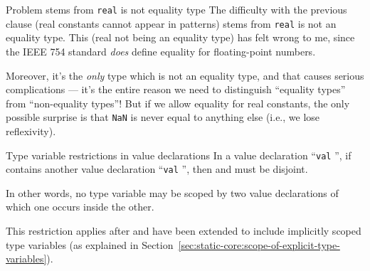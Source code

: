 \begin{remark}{Problem stems from \texttt{real} is not equality type}
The difficulty with the previous clause (real constants cannot appear in
patterns) stems from \texttt{real} is not an equality type. This (real
not being an equality type) has felt wrong to me, since the IEEE 754
standard \emph{does} define equality for floating-point
numbers.

Moreover, it's the \emph{only} type which is not an equality
type, and that causes serious complications --- it's the entire reason we
need to distinguish ``equality types'' from ``non-equality types''! But
if we allow equality for real constants, the only possible surprise is
that \texttt{NaN} is never equal to anything else (i.e., we lose
reflexivity). 
\end{remark}

\begin{clause}{Type variable restrictions in value declarations}\label{clause:syntax-core:type-variable-restrictions-in-value-declarations}
In a value declaration ``\texttt{val}  '', if
 contains another value declaration ``\texttt{val} 
'', then  and  must be disjoint.

In other words, no type variable may be scoped by two value declarations
of which one occurs inside the other.

This restriction applies after  and  have been
extended to include implicitly scoped type variables (as explained in
Section~\ref{sec:static-core:scope-of-explicit-type-variables}).
\end{clause}